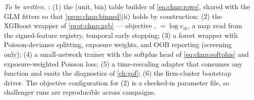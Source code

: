 \begin{codehooks}
\emph{To be written.} : (1) the
(unit, bin) table builder of \cref{eq:chnp:rows}, shared with the GLM
fitters so that \cref{prop:chnp:binned}(ii) holds by construction; (2)
the XGBoost wrapper of \cref{prot:chnp:xgb} --- objective
,  $= \log e_{ik}$, a
 map read from the signed-feature registry,
temporal early stopping; (3) a forest wrapper with Poisson-deviance
splitting, exposure weights, and OOB reporting (screening only); (4) a
small-network trainer with the softplus head of \cref{eq:chnp:softplus}
and exposure-weighted Poisson loss; (5) a time-rescaling adapter that
consumes any  function and emits the
diagnostics of \cref{ch:gof}; (6) the firm-cluster bootstrap driver.
The  objective configuration for (2) is a checked-in
parameter file, so challenger runs are reproducible across campaigns.
\end{codehooks}
